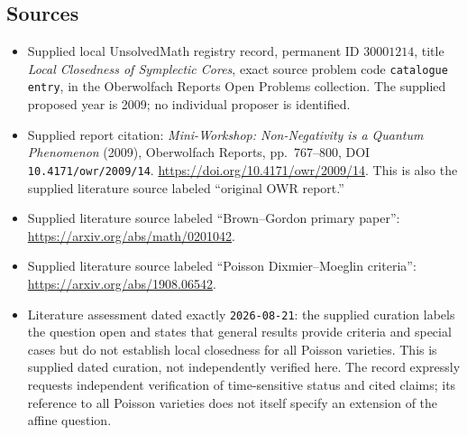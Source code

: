 \documentclass[11pt]{article}
\begin{document}
\subsection{Sources}
\begin{itemize}
\item Supplied local UnsolvedMath registry record, permanent ID \(30001214\), title \emph{Local Closedness of Symplectic Cores}, exact source problem code \texttt{catalogue entry}, in the Oberwolfach Reports Open Problems collection. The supplied proposed year is 2009; no individual proposer is identified.
\item Supplied report citation: \emph{Mini-Workshop: Non-Negativity is a Quantum Phenomenon} (2009), Oberwolfach Reports, pp.~767--800, DOI \texttt{10.4171/owr/2009/14}. \url{https://doi.org/10.4171/owr/2009/14}. This is also the supplied literature source labeled ``original OWR report.''
\item Supplied literature source labeled ``Brown--Gordon primary paper'': \url{https://arxiv.org/abs/math/0201042}.
\item Supplied literature source labeled ``Poisson Dixmier--Moeglin criteria'': \url{https://arxiv.org/abs/1908.06542}.
\item Literature assessment dated exactly \texttt{2026-08-21}: the supplied curation labels the question open and states that general results provide criteria and special cases but do not establish local closedness for all Poisson varieties. This is supplied dated curation, not independently verified here. The record expressly requests independent verification of time-sensitive status and cited claims; its reference to all Poisson varieties does not itself specify an extension of the affine question.
\end{itemize}
\end{document}

